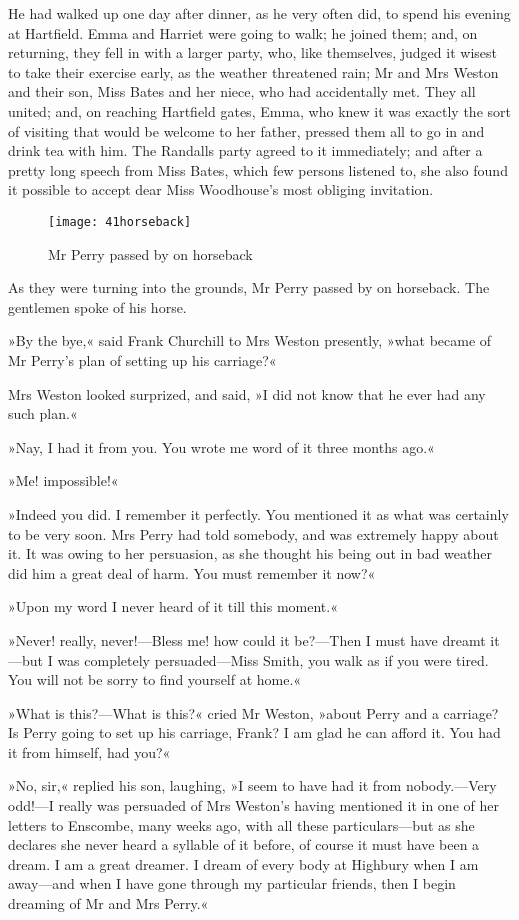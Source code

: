 He had walked up one day after dinner, as he very often did, to spend his evening at Hartfield. Emma and Harriet were going to walk; he joined them; and, on returning, they fell in with a larger party, who, like themselves, judged it wisest to take their exercise early, as the weather threatened rain; Mr and Mrs Weston and their son, Miss Bates and her niece, who had accidentally met. They all united; and, on reaching Hartfield gates, Emma, who knew it was exactly the sort of visiting that would be welcome to her father, pressed them all to go in and drink tea with him. The Randalls party agreed to it immediately; and after a pretty long speech from Miss Bates, which few persons listened to, she also found it possible to accept dear Miss Woodhouse's most obliging invitation.

\begin{figure}[tbph]
\centering
\texttt{[image: 41horseback]}
\caption{Mr Perry passed by on horseback}
\end{figure}

As they were turning into the grounds, Mr Perry passed by on horseback. The gentlemen spoke of his horse.

»By the bye,« said Frank Churchill to Mrs Weston presently, »what became of Mr Perry's plan of setting up his carriage?«

Mrs Weston looked surprized, and said, »I did not know that he ever had any such plan.«

»Nay, I had it from you. You wrote me word of it three months ago.«

»Me! impossible!«

»Indeed you did. I remember it perfectly. You mentioned it as what was certainly to be very soon. Mrs Perry had told somebody, and was extremely happy about it. It was owing to her persuasion, as she thought his being out in bad weather did him a great deal of harm. You must remember it now?«

»Upon my word I never heard of it till this moment.«

»Never! really, never!—Bless me! how could it be?—Then I must have dreamt it—but I was completely persuaded—Miss Smith, you walk as if you were tired. You will not be sorry to find yourself at home.«

»What is this?—What is this?« cried Mr Weston, »about Perry and a carriage? Is Perry going to set up his carriage, Frank? I am glad he can afford it. You had it from himself, had you?«

»No, sir,« replied his son, laughing, »I seem to have had it from nobody.—Very odd!—I really was persuaded of Mrs Weston's having mentioned it in one of her letters to Enscombe, many weeks ago, with all these particulars—but as she declares she never heard a syllable of it before, of course it must have been a dream. I am a great dreamer. I dream of every body at Highbury when I am away—and when I have gone through my particular friends, then I begin dreaming of Mr and Mrs Perry.«

